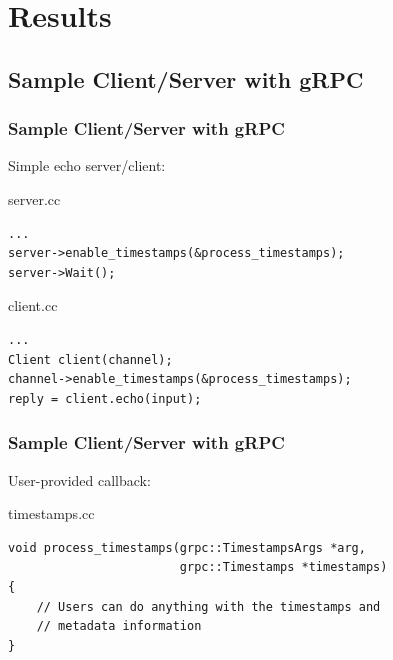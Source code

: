\documentclass[10pt]{beamer}
\begin{document}

\section{Results}


\subsection{Sample Client/Server with gRPC}
\begin{frame}[fragile]
\frametitle{Sample Client/Server with gRPC}
Simple echo server/client:
\begin{block}{\normalsize server.cc}
      {\small
      \begin{verbatim}
...
server->enable_timestamps(&process_timestamps);
server->Wait();\end{verbatim}
      }
\end{block}
\begin{block}{\normalsize client.cc}
      {\small
      \begin{verbatim}
...
Client client(channel);
channel->enable_timestamps(&process_timestamps);
reply = client.echo(input);\end{verbatim}
      }
\end{block}
\end{frame}

\begin{frame}[fragile]
\frametitle{Sample Client/Server with gRPC}
User-provided callback:
\begin{block}{\normalsize timestamps.cc}
      {\small
      \begin{verbatim}
void process_timestamps(grpc::TimestampsArgs *arg,
                        grpc::Timestamps *timestamps)
{
    // Users can do anything with the timestamps and
    // metadata information
}\end{verbatim}
      }
\end{block}
\end{frame}
\end{document}

